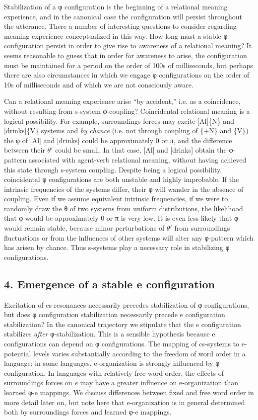    Stabilization of a φ configuration is the beginning of a relational meaning experience, and in the canonical case the configuration will persist throughout the utterance. There a number of interesting questions to consider regarding meaning experience conceptualized in this way. How long must a stable φ configuration persist in order to give rise to awareness of a relational meaning? It seems reasonable to guess that in order for awareness to arise, the configuration must be maintained for a period on the order of 100s of milliseconds, but perhaps there are also circumstances in which we engage φ configurations on the order of 10s of milliseconds and of which we are not consciously aware.

  Can a relational meaning experience arise “by accident,” i.e. as a coincidence, without resulting from s-system φ-coupling? Coincidental relational meaning is a logical possibility. For example, surroundings forces may excite [Al]\{N\} and [drinks]\{V\} systems and \textit{by chance} (i.e. not through coupling of \{+N\} and \{V\}) the φ of [Al] and [drinks] could be approximately 0 or π, and the difference between their $\theta ′$ could be small. In that case, [Al] and [drinks] obtain the φ-pattern associated with agent-verb relational meaning, without having achieved this state through s-system coupling. Despite being a logical possibility, coincidental φ configurations are both unstable and highly improbable. If the intrinsic frequencies of the systems differ, their φ will wander in the absence of coupling. Even if we assume equivalent intrinsic frequencies, if we were to randomly draw the θ of two systems from uniform distributions, the likelihood that φ would be approximately 0 or π is very low. It is even less likely that φ would remain stable, because minor perturbations of $\theta ′$ from surroundings fluctuations or from the influences of other systems will alter any φ-pattern which has arisen by chance. Thus s-systems play a necessary role in stabilizing φ configurations.

\subsection{4. Emergence of a stable e configuration}

Excitation of cs-resonances necessarily precedes stabilization of φ configurations, but does φ configuration stabilization necessarily precede e configuration stabilization? In the canonical trajectory we stipulate that the e configuration stabilizes \textit{after} φ-stabilization. This is a sensible hypothesis because e configurations can depend on φ configurations. The mapping of cs-systems to e-potential levels varies substantially according to the freedom of word order in a language: in some languages, e-organization is strongly influenced by φ configuration. In languages with relatively free word order, the effects of surroundings forces on \textit{e} may have a greater influence on e-organization than learned φ-e mappings. We discuss differences between fixed and  free word order in more detail later on, but note here that e-organization is in general determined both by surroundings forces and learned φ-e mappings.


